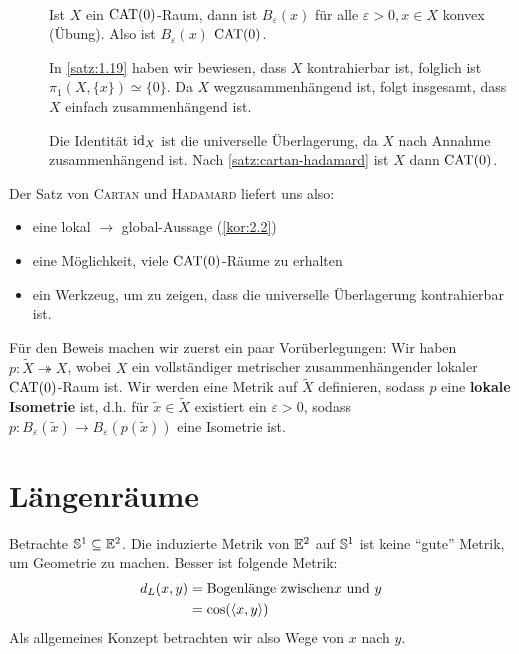 \begin{beweis}
	\mbox{} \\[-.9cm]
	\begin{description}
		\item[\bewrueck] Ist $X$ ein $\operatorname{CAT(0)}$-Raum, dann ist $B_\varepsilon(x)$ für alle $\varepsilon > 0, x \in X$ konvex (Übung). Also ist $B_\varepsilon(x)$ $\operatorname{CAT(0)}$.
		
		In \autoref{satz:1.19} haben wir bewiesen, dass $X$ kontrahierbar ist, folglich ist $\pi_1(X,\{x\}) \simeq \{0\}$.
		Da $X$ wegzusammenhängend ist, folgt insgesamt, dass $X$ einfach zusammenhängend ist.
		\item[\bewhin] Die Identität $\operatorname{id}_X$ ist die universelle Überlagerung, da $X$ nach Annahme zusammenhängend ist. Nach \autoref{satz:cartan-hadamard} ist $X$ dann $\operatorname{CAT(0)}$. \qedhere
	\end{description}
\end{beweis}

Der Satz von \textsc{Cartan} und \textsc{Hadamard} liefert uns also:
\begin{itemize}
	\item eine lokal $\rightarrow$ global-Aussage (\autoref{kor:2.2})
	\item eine Möglichkeit, viele $\operatorname{CAT(0)}$-Räume zu erhalten
	\item ein Werkzeug, um zu zeigen, dass die universelle Überlagerung kontrahierbar ist.
\end{itemize}

Für den Beweis machen wir zuerst ein paar Vorüberlegungen: Wir haben $p \colon \tilde{X} \twoheadrightarrow X$, wobei $X$ ein vollständiger metrischer zusammenhängender lokaler $\operatorname{CAT(0)}$-Raum ist. Wir werden eine Metrik auf $\tilde{X}$ definieren, sodass $p$ eine \textbf{lokale Isometrie} ist, d.h. für $\tilde{x} \in \tilde{X}$ existiert ein $\varepsilon > 0$, sodass $p \colon B_\varepsilon(\tilde{x}) \rightarrow B_\varepsilon(p(\tilde{x}))$ eine Isometrie ist.

\section{Längenräume}
\label{sec:2.1}
	Betrachte $\mathbb{S}^1 \subseteq \mathbb{E}^2$. Die induzierte Metrik von $\mathbb{E}^2$ auf $\mathbb{S}^1$ ist keine \enquote{gute} Metrik, um Geometrie zu machen. Besser ist folgende Metrik:
	\begin{align*}
		d_L(x,y) &= \text{Bogenlänge zwischen} x \text{ und } y \\
		&= \cos(\langle x,y\rangle)
	\end{align*}
	Als allgemeines Konzept betrachten wir also Wege von $x$ nach $y$.
	
